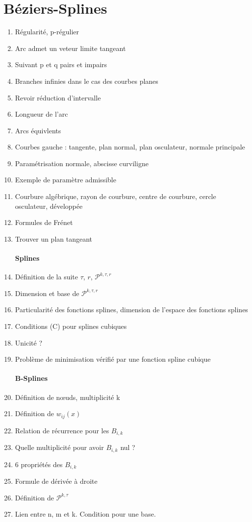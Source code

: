 \documentclass{article}
\begin{document}
\part{Béziers-Splines}
\begin{enumerate}
\section{Approximation de courbes dans $\mathbb{R}$}
\subsection{Courbes paramétrées}
\item Régularité, p-régulier
\item Arc admet un veteur limite tangeant
\item Suivant p et q pairs et impairs
\item Branches infinies dans le cas des courbes planes
\item Revoir réduction d'intervalle
\item Longueur de l'arc
\item Arcs équivlents
\item Courbes gauche : tangente, plan normal, plan osculateur, normale principale
\item Paramétrisation normale, abscisse curviligne
\item Exemple de paramètre admissible
\item Courbure algébrique, rayon de courbure, centre de courbure, cercle osculateur, développée
\item Formules de Frénet
\item Trouver un plan tangeant
\subsection{Splines}
\item Définition de la suite $\tau$, $r$, $\mathcal{P}^{k,\tau,r}$
\item Dimension et base de $\mathcal{P}^{k,\tau,r}$
\item Particularité des fonctions splines, dimension de l'espace des fonctions splines
\item Conditions (C) pour splines cubiques
\item Unicité ?
\item Problème de minimisation vérifié par une fonction spline cubique
\subsection{B-Splines}
\item Définition de n\oe uds, multiplicité k
\item Définition de $w_{ij}(x)$
\item Relation de récurrence pour les $B_{i,k}$
\item Quelle multiplicité pour avoir $B_{i,k}$ nul ?
\item 6 propriétés des $B_{i,k}$
\item Formule de dérivée à droite
\item Définition de $\mathcal{P}^{k,\tau}$
\item Lien entre n, m et k. Condition pour une base.

\end{enumerate}
\end{document}
